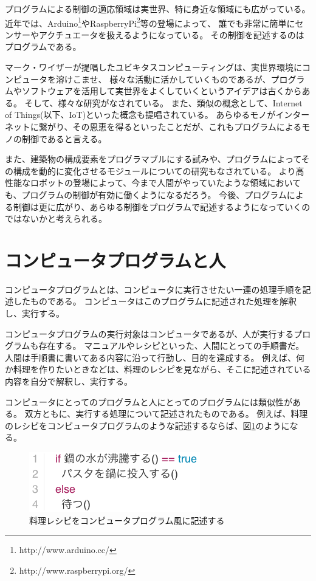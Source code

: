 プログラムによる制御の適応領域は実世界、特に身近な領域にも広がっている。
近年では、Arduino\footnote{http://www.arduino.cc/}やRaspberryPi\footnote{http://www.raspberrypi.org/}等の登場によって、
誰でも非常に簡単にセンサーやアクチュエータを扱えるようになっている。
その制御を記述するのはプログラムである。

マーク・ワイザーが提唱したユビキタスコンピューティング\cite{weiser1991computer}は、実世界環境にコンピュータを溶けこませ、
様々な活動に活かしていくものであるが、プログラムやソフトウェアを活用して実世界をよくしていくというアイデアは古くからある。
そして、様々な研究がなされている。 また、類似の概念として、Internet of
Things(以下、IoT)\cite{iot}といった概念も提唱されている。
あらゆるモノがインターネットに繋がり、その恩恵を得るといったことだが、これもプログラムによるモノの制御であると言える。

また、建築物の構成要素をプログラマブルにする試み\cite{squama}や、プログラムによってその構成を動的に変化させるモジュールについての研究もなされている。
より高性能なロボットの登場によって、今まで人間がやっていたような領域においても、プログラムの制御が有効に働くようになるだろう。
今後、プログラムによる制御は更に広がり、あらゆる制御をプログラムで記述するようになっていくのではないかと考えられる。

\section{コンピュータプログラムと人}\label{ux30b3ux30f3ux30d4ux30e5ux30fcux30bfux30d7ux30edux30b0ux30e9ux30e0ux3068ux4eba}

コンピュータプログラムとは、コンピュータに実行させたい一連の処理手順を記述したものである。
コンピュータはこのプログラムに記述された処理を解釈し、実行する。

コンピュータプログラムの実行対象はコンピュータであるが、人が実行するプログラムも存在する。
マニュアルやレシピといった、人間にとっての手順書だ。
人間は手順書に書いてある内容に沿って行動し、目的を達成する。
例えば、何か料理を作りたいときなどは、料理のレシピを見ながら、そこに記述されている内容を自分で解釈し、実行する。

コンピュータにとってのプログラムと人にとってのプログラムには類似性がある。
双方ともに、実行する処理について記述されたものである。
例えば、料理のレシピをコンピュータプログラムのような記述するならば、図\ref{fig:background_cooking}のようになる。

\begin{figure}[htbp]
  \begin{center}
  \includegraphics[width=.4\linewidth,bb=0 0 281 98]{images/background_cooking.js.png}
  \end{center}
  \caption{料理レシピをコンピュータプログラム風に記述する}
  \label{fig:background_cooking}
\end{figure}

